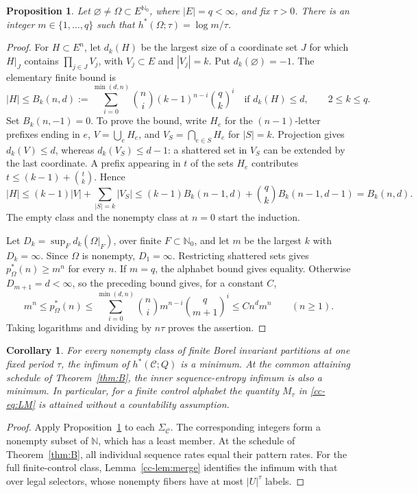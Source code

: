 \documentclass[11pt,reqno]{amsart}
\numberwithin{equation}{section}
\newtheorem{proposition}[theorem]{Proposition}
\newtheorem{corollary}[theorem]{Corollary}
\theoremstyle{definition}
\newcommand{\N}{\mathbb N}
\newcommand{\Nzero}{\mathbb N_0}
\newcommand{\C}{\mathcal C}
\newcommand{\hpat}{h^{*}}
\begin{document}
\begin{proposition}\label{prop:quantization}
Let $\varnothing\ne\Omega\subset E^{\Nzero}$, where $|E|=q<\infty$,
and fix $\tau>0$. There is an integer $m\in\{1,\ldots,q\}$ such that
$\hpat(\Omega;\tau)=\log m/\tau$.
\end{proposition}
\begin{proof}
For $H\subset E^n$, let $d_k(H)$ be the largest size of a coordinate
set $J$ for which $H|_J$ contains $\prod_{j\in J}V_j$, with
$V_j\subset E$ and $|V_j|=k$. Put $d_k(\varnothing)=-1$.
The elementary finite bound is
\[
 |H|\le B_k(n,d):=
 \sum_{i=0}^{\min(d,n)}\binom ni(k-1)^{n-i}\binom qk^i
 \quad\text{if }d_k(H)\le d,\qquad 2\le k\le q.
\]
Set $B_k(n,-1)=0$. To prove the bound, write $H_e$ for the
$(n-1)$-letter prefixes ending in $e$, $V=\bigcup_eH_e$, and
$V_S=\bigcap_{e\in S}H_e$ for $|S|=k$. Projection gives
$d_k(V)\le d$, whereas $d_k(V_S)\le d-1$: a shattered set in
$V_S$ can be extended by the last coordinate. A prefix appearing
in $t$ of the sets $H_e$ contributes
$t\le(k-1)+\binom tk$. Hence
\[
 |H|\le(k-1)|V|+\sum_{|S|=k}|V_S|
 \le(k-1)B_k(n-1,d)+\binom qk B_k(n-1,d-1)
 =B_k(n,d).
\]
The empty class and the nonempty class at $n=0$ start the induction.

Let $D_k=\sup_Fd_k(\Omega|_F)$, over finite $F\subset\Nzero$,
and let $m$ be the largest $k$ with $D_k=\infty$.
Since $\Omega$ is nonempty, $D_1=\infty$.
Restricting shattered sets gives $p_\Omega^*(n)\ge m^n$ for every
$n$. If $m=q$, the alphabet bound gives equality. Otherwise
$D_{m+1}=d<\infty$, so the preceding bound gives, for a constant $C$,
\[
 m^n\le p_\Omega^*(n)
 \le\sum_{i=0}^{\min(d,n)}\binom ni m^{n-i}\binom q{m+1}^i
 \le C n^d m^n\qquad(n\ge1).
\]
Taking logarithms and dividing by $n\tau$ proves the assertion.
\end{proof}

\begin{corollary}\label{cor:pattern-minimum}
For every nonempty class of finite Borel invariant partitions at
one fixed period $\tau$, the infimum of $\hpat(\C;Q)$ is a minimum.
At the common attaining schedule of Theorem~\ref{thm:B}, the inner
sequence-entropy infimum is also a minimum. In particular, for a
finite control alphabet the quantity $M_\tau$ in
\eqref{cc-eq:LM} is attained without a countability assumption.
\end{corollary}
\begin{proof}
Apply Proposition~\ref{prop:quantization} to each $\Sigma_\C$.
The corresponding integers form a nonempty subset of $\N$, which
has a least member. At the schedule of Theorem~\ref{thm:B}, all
individual sequence rates equal their pattern rates.
For the full finite-control class, Lemma~\ref{cc-lem:merge}
identifies the infimum with that over legal selectors, whose
nonempty fibers have at most $|U|^\tau$ labels.
\end{proof}
\end{document}
